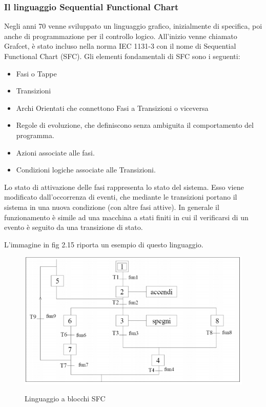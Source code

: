 \documentclass[12pt, a4paper, oneside]{book}
\begin{document}
\subsubsection{Il linguaggio Sequential Functional Chart}
Negli anni 70 venne sviluppato un linguaggio grafico, inizialmente di specifica, poi anche di programmazione per il controllo logico. All'inizio venne chiamato Grafcet, è stato incluso nella norma IEC 1131-3 con il nome di Sequential Functional Chart (SFC). 
Gli elementi fondamentali di SFC sono i seguenti:
\begin{itemize}
	\item Fasi o Tappe
	\item Transizioni
	\item Archi Orientati che connettono Fasi a Transizioni o viceversa
	\item Regole di evoluzione, che definiscono senza ambiguita il comportamento del programma.
	\item Azioni associate alle fasi.
	\item Condizioni logiche associate alle Transizioni.
\end{itemize}

Lo stato di attivazione delle fasi rappresenta lo stato del sistema. Esso viene modificato dall'occorrenza di eventi, che mediante le transizioni portano il sistema in una nuova condizione (con altre fasi attive). In generale il funzionamento è simile ad una macchina a stati finiti in cui il verificarsi di un evento è seguito da una transizione di stato.

L'immagine in fig 2.15 riporta un esempio di questo linguaggio.

	\begin{figure}[H]
	\centering
	\includegraphics[width=12cm]{Immagini/BLK}
	\label{BLK}
	\caption{Linguaggio a blocchi SFC}
\end{figure}
\end{document}
